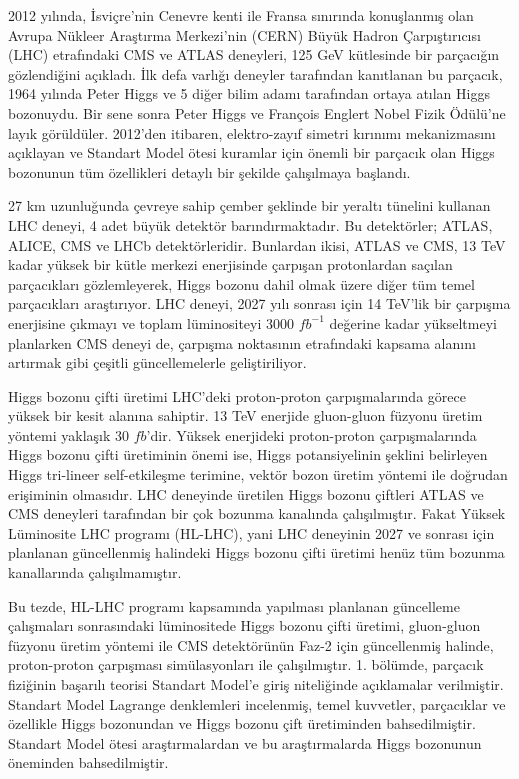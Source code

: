 2012 yılında, İsviçre’nin  Cenevre  kenti  ile  Fransa  sınırında  konuşlanmış olan Avrupa Nükleer Araştırma Merkezi’nin (CERN) Büyük Hadron Çarpıştırıcısı (LHC) etrafındaki CMS  ve  ATLAS  deneyleri, 125 GeV kütlesinde bir parçacığın gözlendiğini açıkladı. İlk defa varlığı deneyler tarafından kanıtlanan bu parçacık, 1964 yılında Peter Higgs ve 5 diğer bilim adamı tarafından ortaya atılan Higgs bozonuydu. Bir sene sonra Peter Higgs ve François Englert Nobel Fizik Ödülü'ne layık görüldüler. 2012'den itibaren, elektro-zayıf simetri kırınımı mekanizmasını açıklayan ve Standart Model ötesi kuramlar için önemli bir parçacık olan Higgs bozonunun tüm özellikleri detaylı bir şekilde çalışılmaya başlandı.

27 km uzunluğunda çevreye sahip çember şeklinde bir yeraltı tünelini kullanan LHC deneyi, 4 adet büyük detektör barındırmaktadır. Bu detektörler; ATLAS, ALICE, CMS ve LHCb detektörleridir. Bunlardan ikisi, ATLAS ve CMS, 13 TeV kadar yüksek bir kütle merkezi enerjisinde çarpışan protonlardan saçılan parçacıkları gözlemleyerek, Higgs bozonu dahil olmak üzere diğer tüm temel parçacıkları araştırıyor. LHC deneyi, 2027 yılı sonrası için 14 TeV'lik bir çarpışma enerjisine çıkmayı ve toplam lüminositeyi 3000 $fb^{-1}$ değerine kadar yükseltmeyi planlarken CMS deneyi de, çarpışma noktasının etrafındaki kapsama alanını artırmak gibi çeşitli güncellemelerle geliştiriliyor.

Higgs bozonu çifti üretimi LHC'deki proton-proton çarpışmalarında görece yüksek bir kesit alanına sahiptir. 13 TeV enerjide gluon-gluon füzyonu üretim yöntemi yaklaşık 30 $fb$'dir. Yüksek enerjideki proton-proton çarpışmalarında Higgs bozonu çifti üretiminin önemi ise, Higgs potansiyelinin şeklini belirleyen Higgs tri-lineer self-etkileşme terimine, vektör bozon üretim yöntemi ile doğrudan erişiminin olmasıdır. LHC deneyinde üretilen Higgs bozonu çiftleri ATLAS ve CMS deneyleri tarafından bir çok bozunma kanalında çalışılmıştır. Fakat Yüksek Lüminosite LHC programı (HL-LHC), yani LHC deneyinin 2027 ve sonrası için planlanan güncellenmiş halindeki Higgs bozonu çifti üretimi henüz tüm bozunma kanallarında çalışılmamıştır.

Bu tezde, HL-LHC programı kapsamında yapılması planlanan güncelleme çalışmaları sonrasındaki lüminositede Higgs bozonu çifti üretimi, gluon-gluon füzyonu üretim yöntemi ile CMS detektörünün Faz-2 için güncellenmiş halinde, proton-proton çarpışması simülasyonları ile çalışılmıştır. 1. bölümde, parçacık fiziğinin başarılı teorisi Standart Model'e giriş niteliğinde açıklamalar verilmiştir. Standart Model Lagrange denklemleri incelenmiş, temel kuvvetler, parçacıklar ve özellikle Higgs bozonundan ve Higgs bozonu çift üretiminden bahsedilmiştir. Standart Model ötesi araştırmalardan ve bu araştırmalarda Higgs bozonunun öneminden bahsedilmiştir.

